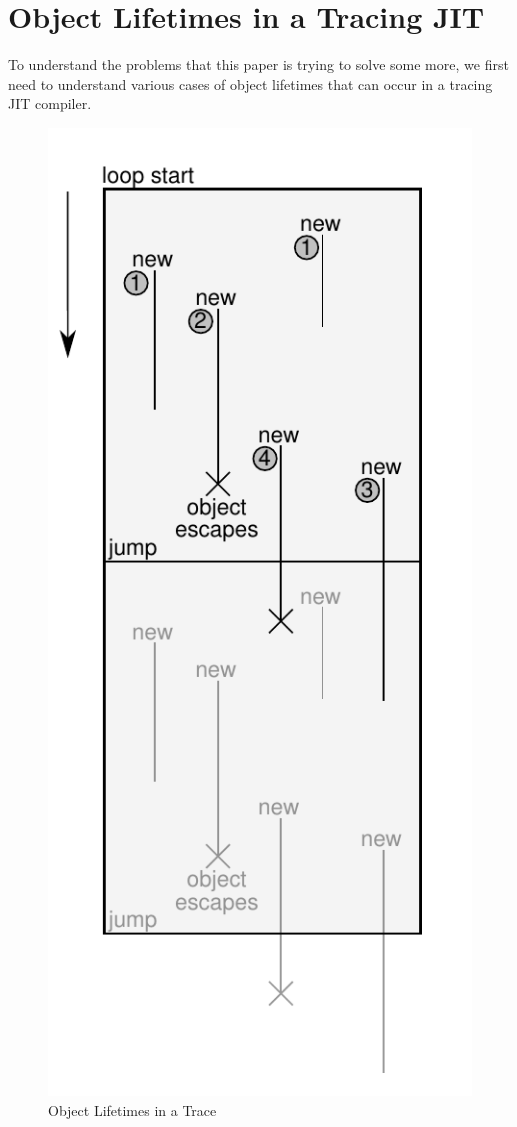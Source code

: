 \documentclass{sigplanconf}
\begin{document}
\section{Object Lifetimes in a Tracing JIT}
\label{sec:lifetimes}


To understand the problems that this paper is trying to solve some more, we
first need to understand various cases of object lifetimes that can occur in a
tracing JIT compiler.

\begin{figure}
\includegraphics{figures/obj-lifetime.pdf}

\caption{Object Lifetimes in a Trace}
\label{fig:lifetimes}
\end{figure}
\end{document}
